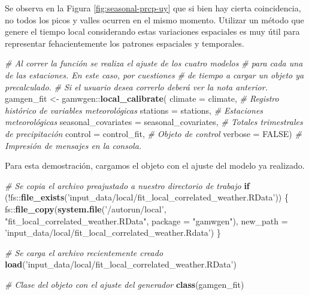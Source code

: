 \documentclass[
  12pt]{article}
\newenvironment{Shaded}{}{}
\newcommand{\CommentTok}[1]{\textcolor[rgb]{0.38,0.63,0.69}{\textit{#1}}}
\newcommand{\ControlFlowTok}[1]{\textcolor[rgb]{0.00,0.44,0.13}{\textbf{#1}}}
\newcommand{\DataTypeTok}[1]{\textcolor[rgb]{0.56,0.13,0.00}{#1}}
\newcommand{\KeywordTok}[1]{\textcolor[rgb]{0.00,0.44,0.13}{\textbf{#1}}}
\newcommand{\NormalTok}[1]{#1}
\newcommand{\OperatorTok}[1]{\textcolor[rgb]{0.40,0.40,0.40}{#1}}
\newcommand{\OtherTok}[1]{\textcolor[rgb]{0.00,0.44,0.13}{#1}}
\newcommand{\StringTok}[1]{\textcolor[rgb]{0.25,0.44,0.63}{#1}}
\begin{document}
Se observa en la Figura \ref{fig:seasonal-prcp-uy} que si bien hay cierta coincidencia, no todos los picos y valles ocurren en el mismo momento. Utilizar un método que genere el tiempo local considerando estas variaciones espaciales es muy útil para representar fehacientemente los patrones espaciales y temporales.

\begin{Shaded}
\begin{Highlighting}[]
\CommentTok{# Al correr la función se realiza el ajuste de los cuatro modelos }
\CommentTok{# para cada una de las estaciones. En este caso, por cuestiones }
\CommentTok{# de tiempo a cargar un objeto ya precalculado. }
\CommentTok{# Si el usuario desea correrlo deberá ver la nota anterior.}
\NormalTok{gamgen_fit <-}\StringTok{ }\NormalTok{gamwgen}\OperatorTok{::}\KeywordTok{local_calibrate}\NormalTok{(}
  \DataTypeTok{climate =}\NormalTok{ climate, }
  \CommentTok{# Registro histórico de variables meteorológicas}
  \DataTypeTok{stations =}\NormalTok{ stations, }
  \CommentTok{# Estaciones meteorológicas }
  \DataTypeTok{seasonal_covariates =}\NormalTok{ seasonal_covariates, }
  \CommentTok{# Totales trimestrales de precipitación}
  \DataTypeTok{control =}\NormalTok{ control_fit, }
  \CommentTok{# Objeto de control}
  \DataTypeTok{verbose =} \OtherTok{FALSE}\NormalTok{) }
\CommentTok{# Impresión de mensajes en la consola.}
\end{Highlighting}
\end{Shaded}

Para esta demostración, cargamos el objeto con el ajuste del modelo ya realizado.

\begin{Shaded}
\begin{Highlighting}[]
\CommentTok{# Se copia el archivo preajustado a nuestro directorio de trabajo}
\ControlFlowTok{if}\NormalTok{ (}\OperatorTok{!}\NormalTok{fs}\OperatorTok{::}\KeywordTok{file_exists}\NormalTok{(}\StringTok{'input_data/local/fit_local_correlated_weather.RData'}\NormalTok{)) \{}
\NormalTok{  fs}\OperatorTok{::}\KeywordTok{file_copy}\NormalTok{(}\KeywordTok{system.file}\NormalTok{(}\StringTok{'/autorun/local'}\NormalTok{, }\StringTok{"fit_local_correlated_weather.RData"}\NormalTok{,}
                            \DataTypeTok{package =} \StringTok{"gamwgen"}\NormalTok{),}
                \DataTypeTok{new_path =} \StringTok{'input_data/local/fit_local_correlated_weather.Rdata'}\NormalTok{)}
\NormalTok{\}}

\CommentTok{# Se carga el archivo recientemente creado}
\KeywordTok{load}\NormalTok{(}\StringTok{'input_data/local/fit_local_correlated_weather.RData'}\NormalTok{)}

\CommentTok{# Clase del objeto con el ajuste del generador}
\KeywordTok{class}\NormalTok{(gamgen_fit)}
\end{Highlighting}
\end{Shaded}
\end{document}
